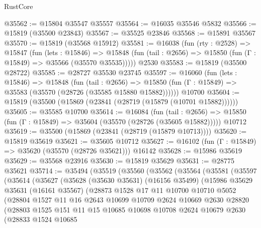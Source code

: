 \begin{lexlean}{RustCore}
\begin{coremodule}
@35562 := @15804 @35547 @35557
@35564 := @16035 @35546 @5832
@35566 := @15819 (@35500 @23843)
@35567 := @35525 @23846
@35568 := @15891 @35567
@35570 := @15819 (@35568 @15912)
@35581 := @16038
    (fun (rty : @2528) =>
    @15847
      (fun (lets : @15846) =>
      @15848 (fun (tail : @2656) => @15850 (fun (Γ : @15849) => @35566 (@35570 @35535)))))
    @2530
@35583 := @15819 (@35500 @28722)
@35585 := @28727 @35530 @23745
@35597 := @16060
    (fun (lets : @15846) =>
    @15848
      (fun (tail : @2656) =>
      @15850 (fun (Γ : @15849) => @35583 (@35570 (@28726 (@35585 @15880 @15882))))))
    @10700
@35604 := @15819 (@35500 (@15869 (@23841 (@28719 (@15879 (@10701 @15882))))))
@35605 := @35585 @10700
@35614 := @16084
    (fun (tail : @2656) => @15850 (fun (Γ : @15849) => @35604 (@35570 (@28726 (@35605 @15882)))))
    @10712
@35619 := @35500 (@15869 (@23841 (@28719 (@15879 @10713))))
@35620 := @15819 @35619
@35621 := @35605 @10712
@35627 := @16102 (fun (Γ : @15849) => @35620 (@35570 (@28726 @35621))) @16142
@35628 := @15986 @35619
@35629 := @35568 @23916
@35630 := @15819 @35629
@35631 := @28775 @35621
@35714 := @35494
    (@35519
      (@35560
        (@35562
          (@35564
            (@35581
              (@35597
                (@35614
                  (@35627
                    (@35628
                      (@35630 @35631)
                      (@16156 @35499)
                      (@15986
                        @35629
                        @35631
                        (@16161 @35567)
                        (@28873
                          @1528
                          @17
                          @11
                          @10700
                          @10710
                          @5052
                          (@28804
                            @1527
                            @11
                            @16
                            @2643
                            @10699
                            @10709
                            @2624
                            @10669
                            @2630
                            @28820
                            (@28803
                              @1525
                              @151
                              @11
                              @15
                              @10685
                              @10698
                              @10708
                              @2624
                              @10679
                              @2630
                              (@28833
                                @1524
                                @10685

\end{coremodule}
\end{lexlean}
